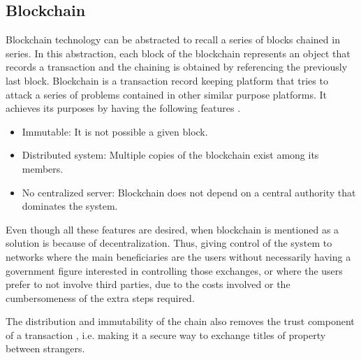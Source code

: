 \subsection{Blockchain}

Blockchain technology can be abstracted to recall a series of blocks chained in series. In this abstraction, each block of the blockchain represents an object that records a transaction and the chaining is obtained by referencing the previously last block. Blockchain is a transaction record keeping platform that tries to attack a series of problems contained in other similar purpose platforms. It achieves its purposes by having the following features \cite{block}.

\begin{itemize}
\item Immutable: It is not possible a given block.
\item Distributed system: Multiple copies of the blockchain exist among its members.
\item No centralized server: Blockchain does not depend on a central authority that dominates the system.            
\end{itemize}
Even though all these features are desired, when blockchain is mentioned as a solution is because of decentralization. Thus, giving control of the system to networks where the main beneficiaries are the users without necessarily having a government figure interested in controlling those exchanges, or where the users prefer to not involve third parties, due to the costs involved or the cumbersomeness of the extra steps required. 

The distribution and immutability of the chain also removes the trust component of a transaction \cite{iot}, i.e. making it a secure way to exchange titles of property between strangers.
